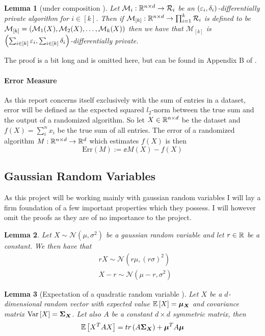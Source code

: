 \documentclass[a4paper,12pt]{article}
\newtheorem{lemma}{Lemma}[section]
\begin{document}
\begin{lemma}[\edp under composition  ] %
\label{lem:dpcombine}
Let $\mathcal{M}_i: \mathbb{R}^{n \times d} \rightarrow \mathcal{R}_i$ be an $\left (\varepsilon_i, \delta_i\right)$-differentially private algorithm
for $i \in [k]$. Then if $\mathcal{M}_{[k]} : \mathbb{R}^{n \times d} \rightarrow \prod_{i=1}^{k} \mathcal{R}_i$ is defined to be
$\mathcal{M}_{[k]} = \left (\mathcal{M}_1(X), \mathcal{M}_2(X), \dots, \mathcal{M}_{k}(X)\right)$ then we have that
$\mathcal{M}_{[k]}$ is $\left ( \sum_{i \in [k]} \varepsilon_i , \sum_{i \in [k]} \delta_i \right)$-differentially private.
\end{lemma}
\noindent The proof is a bit long and is omitted here, but can be found in Appendix B of \cite{dpbasic}.



\paragraph{Error Measure}
As this report concerns itself exclusively with the sum of entries 
in a dataset, error will be defined as the expected
squared $l_2$-norm between the true sum and 
the output of a randomized algorithm.
So let $X \in \mathbb{R}^{n \times d}$ be the dataset and
$f(X) = \sum_i^n x_i$ be the true sum of all entries. The error of a
randomized algorithm $M : \mathbb{R}^{n \times d} \rightarrow \mathbb{R}^d$
which estimates $f(X)$ is then 
\[
    \text{Err}(M) := \ee{M(X) - f(X)}
\]

\subsection{Gaussian Random Variables}
As this project will be working mainly with gaussian random variables I will 
lay a firm foundation of a few important properties which they possess. 
I will however omit the proofs as they are of no importance to the project.

\begin{lemma}
\label{lem:GaussTrans}
Let $X \sim \mathcal{N}(\mu, \sigma^2)$ be a gaussian random variable and let $r \in \mathbb{R}$ be a constant.
We then have that
\begin{align*}
    &rX \sim \mathcal{N}(r\mu, (r\sigma)^2) \\
    &X - r \sim \mathcal{N}(\mu-r, \sigma^2) 
\end{align*}
    
\end{lemma}

\begin{lemma}[Expectation of a quadratic random variable ]
\label{lem:ExpQuad}
Let $X$ be a $d$-dimensional random vector with expected value $\mathbb{E} \left [ X  \right] =  \bm{\mu_{X}}$
and covariance matrix $\text{Var} \left [ X  \right] = \bm{\Sigma_{X}}$. Let also $A$ be a constant 
$d \times d$ symmetric matrix, then 
\[
    \mathbb{E} \left [ X^T A X  \right] = tr \left (A \bm{\Sigma_X}\right) + \bm{\mu}^T A\bm{\mu}
\]
\end{lemma}
\end{document}
